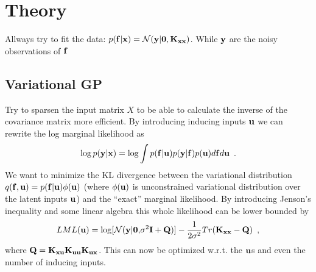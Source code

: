 \documentclass[11pt, a4paper]{article}
\begin{document}
\section{Theory}
\label{sec:theory}

Allways try to fit the data: $p({\bf f|x}) = \mathcal N({\bf y|0,K_{xx}})$. While ${\bf y}$ are the noisy observations of $\bf f$

\subsection{Variational GP}
\label{sec:vargpp}
Try to sparsen the input matrix $X$ to be able to calculate the inverse of the covariance matrix more efficient. By introducing inducing inputs ${\bf u}$ we can rewrite the log marginal likelihood as
\begin{equation}
  \label{eq:gplvm_marginal}
  \log p({\bf y|x}) = \log \int p({\bf f|u})p({\bf y|f})p({\bf u})d{\bf f}d{\bf u}\enspace.
\end{equation}
We want to minimize the KL divergence between the variational distribution $q({\bf f, u})=p({\bf f|u})\phi({\bf u})$ (where $\phi({\bf u})$ is unconstrained variational distribution over the latent inputs $\bf u$) and the ``exact'' marginal likelihood. By introducing Jenson's inequality and some linear algebra this whole likelihood can be lower bounded by
\begin{equation}
  \label{eq:varGPlowerbound}
  LML({\bf u}) = \log[\mathcal N({\bf y|0,}\sigma^2{\bf I+Q})] - \frac 1{2\sigma^2}Tr({\bf K_{xx}-Q})\enspace, 
\end{equation}
where ${\bf Q=K_{xu}K_{uu}K_{ux}}$. This can now be optimized w.r.t. the ${\bf u}$s and even the number of inducing inputs.
\end{document}
